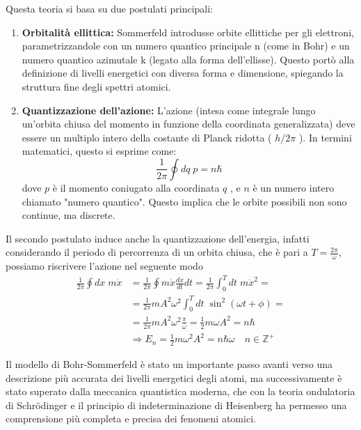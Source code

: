 \noindent Questa teoria si basa su due postulati principali:
\begin{enumerate}
	\item \textbf{Orbitalit\`a ellittica:} Sommerfeld introdusse orbite ellittiche per gli elettroni, parametrizzandole con un numero quantico principale  n  (come in Bohr) e un numero quantico azimutale  k  (legato alla forma dell’ellisse). Questo port\`o alla definizione di livelli energetici con diversa forma e dimensione, spiegando la struttura fine degli spettri atomici.

	\item \textbf{Quantizzazione dell'azione:} L'azione (intesa come integrale lungo un'orbita chiusa del momento in funzione della coordinata generalizzata) deve essere un multiplo intero della costante di Planck ridotta ( $h/2\pi$ ). In termini matematici, questo si esprime come:
	\begin{equation*}
		\frac{1}{2\pi}\oint dq \; p = n \hbar
	\end{equation*}
	dove  $p$  è il momento coniugato alla coordinata  $q$ , e  $n$  è un numero intero chiamato "numero quantico". Questo implica che le orbite possibili non sono continue, ma discrete.
\end{enumerate}
Il secondo postulato induce anche la quantizzazione dell'energia, infatti considerando il periodo di percorrenza di un orbita chiusa, che \`e pari a $T = \frac{2 \pi}{\omega}$, possiamo riscrivere l'azione nel seguente modo
\begin{align*}
	\frac{1}{2\pi} \oint dx\; m\dot{x} & =  \frac{1}{2\pi} \oint m \dot{x} \frac{dx}{dt}dt = \frac{1}{2\pi} \int_{0}^{T} dt\; m\dot{x}^2 = \\[0.5cm]
	& = \frac{1}{2\pi} mA^2\omega^2 \int_{0}^{T}dt \;  \sin^2(\omega t + \phi) = \\[0.5cm]
	& =  \frac{1}{2\pi}mA^2\omega^2 \frac{\pi}{\omega} = \frac{1}{2}m\omega A^2 = n\hbar \\[0.5cm]
	& \Rightarrow E_n = \frac{1}{2}m\omega^2A^2 = n \hbar \omega \quad n \in \mathbb{Z}^+
\end{align*}

\noindent Il modello di Bohr-Sommerfeld \`e stato un importante passo avanti verso una descrizione pi\`u accurata dei livelli energetici degli atomi, ma successivamente \`e stato superato dalla meccanica quantistica moderna, che con la teoria ondulatoria di Schr\"odinger e il principio di indeterminazione di Heisenberg ha permesso una comprensione pi\`u completa e precisa dei fenomeni atomici.
 
